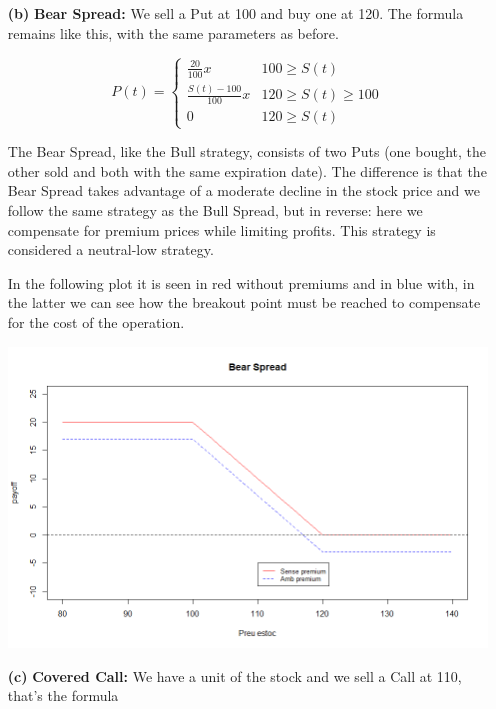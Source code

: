 \documentclass[a4paper,]{article}
\begin{document}
\begin{itemize}
    \item[\textbf{(b)}] \textbf{Bear Spread:} We sell a Put at 100 and buy one at 120. The formula remains like this, with the same parameters as before.
    
    \[ 
    P(t)=
    \begin{cases}
        \frac{20}{100}x & 100\geq S(t) \\
        \frac{S(t)-100}{100}x & 120\geq S(t)\geq 100 \\
        0 & 120\geq S(t) 
    \end{cases}
    \]

    \vspace{3mm}
    \noindent
    The Bear Spread, like the Bull strategy, consists of two Puts (one bought, the other sold and both with the same expiration date). The difference is that the Bear Spread takes advantage of a moderate decline in the stock price and we follow the same strategy as the Bull Spread, but in reverse: here we compensate for premium prices while limiting profits. This strategy is considered a neutral-low strategy.
    
    \vspace{3mm}
    \noindent
    In the following plot it is seen in red without premiums and in blue with, in the latter we can see how the breakout point must be reached to compensate for the cost of the operation.

    \begin{center}
        \includegraphics[scale=0.5]{Bear Spread.png}
    \end{center}

    \item[\textbf{(c)}] \textbf{Covered Call:} We have a unit of the stock and we sell a Call at 110, that's the formula


\end{itemize}
\end{document}
